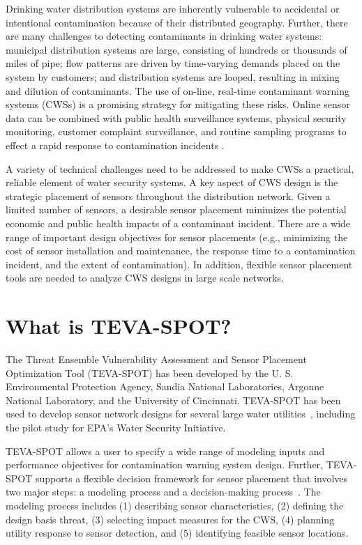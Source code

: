 Drinking water distribution systems are inherently vulnerable to accidental or intentional contamination because of their distributed geography. Further, there are many challenges to detecting contaminants in drinking water systems: municipal distribution systems are large, consisting of hundreds or thousands of miles of pipe; flow patterns are driven by time-\/varying demands placed on the system by customers; and distribution systems are looped, resulting in mixing and dilution of contaminants. The use of on-\/line, real-\/time contaminant warning systems (CWSs) is a promising strategy for mitigating these risks. Online sensor data can be combined with public health surveillance systems, physical security monitoring, customer complaint surveillance, and routine sampling programs to effect a rapid response to contamination incidents \citep{EPA}.

A variety of technical challenges need to be addressed to make CWSs a practical, reliable element of water security systems. A key aspect of CWS design is the strategic placement of sensors throughout the distribution network. Given a limited number of sensors, a desirable sensor placement minimizes the potential economic and public health impacts of a contaminant incident. There are a wide range of important design objectives for sensor placements (e.g., minimizing the cost of sensor installation and maintenance, the response time to a contamination incident, and the extent of contamination). In addition, flexible sensor placement tools are needed to analyze CWS designs in large scale networks.

\section{What is TEVA-\/SPOT?}\label{intro_introTEVASPOT}
The Threat Ensemble Vulnerability Assessment and Sensor Placement Optimization Tool (TEVA-\/SPOT) has been developed by the U. S. Environmental Protection Agency, Sandia National Laboratories, Argonne National Laboratory, and the University of Cincinnati. TEVA-\/SPOT has been used to develop sensor network designs for several large water   utilities~\cite{MorJanMurFox07},  including the pilot study for EPA's Water Security Initiative.

TEVA-\/SPOT allows a user to specify a wide range of modeling inputs and performance objectives for contamination warning system design. Further, TEVA-\/SPOT supports a flexible decision framework for sensor placement that involves two major steps: a modeling process and a decision-\/making   process~\cite{MurBerHar06}.  The modeling process includes (1) describing sensor characteristics, (2) defining the design basis threat, (3) selecting impact measures for the CWS, (4) planning utility response to sensor detection, and (5) identifying feasible sensor locations.

